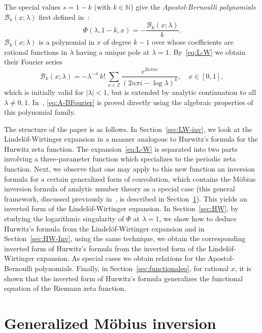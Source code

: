 \documentclass[11pt,a4paper,reqno]{amsart}
\newcommand{\B}{\mathcal{B}}
\newcommand{\N}{\mathbb{N}}
\newcommand{\Z}{\mathbb{Z}}
\theoremstyle{plain}
\theoremstyle{remark}
\numberwithin{equation}{section}
\begin{document}
The special values $s = 1 - k$ (with $k \in \N$) give the \emph{Apostol-Bernoulli polynomials} $\B_{k}(x;\lambda)$ first defined in~\cite{Ap}:
%
\begin{equation}
\label{eq:A-B}
  \Phi(\lambda,1-k,x) = -\frac{\B_k(x;\lambda)}{k}.
\end{equation}
%
$\B_{k}(x;\lambda)$ is a polynomial in $x$ of degree $k-1$ over whose coefficients are rational functions in $\lambda$ having a unique pole at $\lambda = 1$.
By~\eqref{eq:L-W} we obtain their Fourier series
%
\begin{equation}
\label{eq:A-BFourier}
  \B_k(x;\lambda) = -\lambda^{-x}\,k!\, \sum_{n\in\Z} \frac{e^{2n\pi i x}}{(2n\pi i-\log\lambda)^k},
  \quad x\in[0,1],
\end{equation}
%
which is initially valid for $|\lambda|<1$, but is extended by analytic continuation to all $\lambda\neq 0,1$. In~\cite{NRV-MC}, \eqref{eq:A-BFourier} is proved directly using the algebraic properties of this polynomial family.

The structure of the paper is as follows. In Section~\ref{sec:LW-inv}, we look at the Lindel\"of-Wirtinger expansion in a manner analogous to Hurwitz's formula for the Hurwitz zeta function. The expansion~\eqref{eq:L-W} is separated into two parts involving a three-parameter function which specializes to the periodic zeta function. Next, we observe that one may apply to this new function an inversion formula for a certain generalized form of convolution, which contains the M\"obius inversion formula of analytic number theory as a special case (this general framework, discussed previously in~\cite{BNV}, is described in Section~\ref{sec:MobiusInvGen}). This yields an inverted form of the Lindel\"of-Wirtinger expansion. In Section~\ref{sec:HW}, by studying the logarithmic singularity of $\Phi$ at $\lambda = 1$, we show how to deduce Hurwitz's formula from the Lindel\"of-Wirtinger expansion and in Section~\ref{sec:HW-Inv}, using the same technique, we obtain the corresponding inverted form of Hurwitz's formula from the
inverted form of the Lindel\"of-Wirtinger expansion.
As special cases we obtain relations for the Apostol-Bernoulli polynomials.
Finally, in Section~\ref{sec:functionaleq}, for rational $x$, it is shown that the inverted form of Hurwitz's formula generalizes the functional equation of the Riemann zeta function. 


\section{Generalized M\"obius inversion}
\label{sec:MobiusInvGen}
\end{document}
